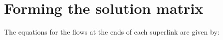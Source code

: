 \documentclass[11pt]{article}
\begin{document}








\section{Forming the solution matrix}

The equations for the flows at the ends of each superlink are given by:
\end{document}
